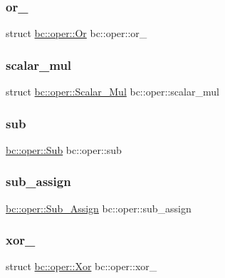 \subsubsection{\texorpdfstring{or\+\_\+}{or\_}}
{\footnotesize\ttfamily struct \hyperlink{structbc_1_1oper_1_1Or}{bc\+::oper\+::\+Or}  bc\+::oper\+::or\+\_\+}

\mbox{\label{namespacebc_1_1oper_a88023efbb639886b4b6b1a6ec5686633}} 
\subsubsection{\texorpdfstring{scalar\+\_\+mul}{scalar\_mul}}
{\footnotesize\ttfamily struct \hyperlink{structbc_1_1oper_1_1Scalar__Mul}{bc\+::oper\+::\+Scalar\+\_\+\+Mul}  bc\+::oper\+::scalar\+\_\+mul}

\mbox{\label{namespacebc_1_1oper_adb76fb39747577e1be7e372917f2953d}} 
\subsubsection{\texorpdfstring{sub}{sub}}
{\footnotesize\ttfamily  \hyperlink{structbc_1_1oper_1_1Sub}{bc\+::oper\+::\+Sub}  bc\+::oper\+::sub}

\mbox{\label{namespacebc_1_1oper_ada648e2c665e51826f9994439416fd35}} 
\subsubsection{\texorpdfstring{sub\+\_\+assign}{sub\_assign}}
{\footnotesize\ttfamily  \hyperlink{structbc_1_1oper_1_1Sub__Assign}{bc\+::oper\+::\+Sub\+\_\+\+Assign}  bc\+::oper\+::sub\+\_\+assign}

\mbox{\label{namespacebc_1_1oper_a22bc35b5efc90b8534e7473dec57e2cb}} 
\subsubsection{\texorpdfstring{xor\+\_\+}{xor\_}}
{\footnotesize\ttfamily struct \hyperlink{structbc_1_1oper_1_1Xor}{bc\+::oper\+::\+Xor}  bc\+::oper\+::xor\+\_\+}

